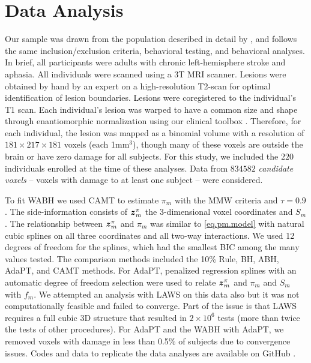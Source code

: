 \documentclass[bimj,fleqn]{w-art}
\newcommand{\mbf}[1]{\mbox{\boldmath${#1}$}}
\theoremstyle{plain}
\theoremstyle{definition}
\begin{document}
\section{Data Analysis}\label{sec.data.anal}


Our sample was drawn from the population described in detail by \cite{Youetal15}, and follows the same inclusion/exclusion criteria, behavioral testing, and behavioral analyses. In brief, all participants were adults with chronic left-hemisphere stroke and aphasia. All individuals were scanned using a 3T MRI scanner. Lesions were obtained by hand by an expert on a high-resolution T2-scan for optimal identification of lesion boundaries. Lesions were coregistered to the individual's T1 scan. Each individual’s lesion was warped to have a common size and shape through enantiomorphic normalization \citep{Nacetal08} using our clinical toolbox \citep{Roretal12}. Therefore, for each individual, the lesion was mapped as a binomial volume with a resolution of $181\times 217 \times 181$ voxels (each 1mm$^3$), though many of these voxels are outside the brain or have zero damage for all subjects. For this study, we included the $220$ individuals enrolled at the time of these analyses. Data from $834582$ \textit{candidate voxels} -- voxels with damage to at least one subject -- were considered. 

To fit WABH we used CAMT to estimate $\pi_m$ with the MMW criteria and $\tau = 0.9$. The side-information consists of $\mbf{z}_m^\pi$ the $3$-dimensional voxel coordinates and $S_m$. The relationship between $\mbf{z}_m^\pi$ and $\pi_m$ was similar to \eqref{eq.pm.model} with natural cubic splines on all three coordinates and all two-way interactions. We used 12 degrees of freedom for the splines, which had the smallest BIC among the many values tested. The comparison methods included the 10\% Rule, BH, ABH, AdaPT, and CAMT methods. For AdaPT, penalized regression splines with an automatic degree of freedom selection were used to relate $\mbf{z}_m^\pi$ and $\pi_m$ and $S_m$ with $f_m$. We attempted an analysis with LAWS on this data also but it was not computationally feasible and failed to converge. Part of the issue is that LAWS requires a full cubic 3D structure that resulted in $2\times 10^6$ tests (more than twice the tests of other procedures). For AdaPT and the WABH with AdaPT, we removed voxels with damage in less than 0.5\% of subjects due to convergence issues. Codes and data to replicate the data analyses are available on GitHub \cite{McLZhe22}.
\end{document}
